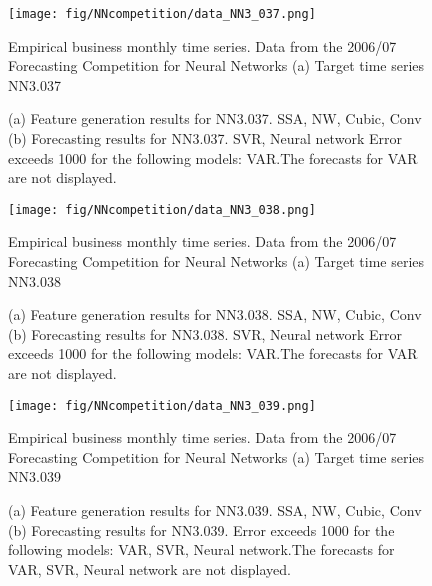 \documentclass[12pt]{article}
\begin{document}
\begin{figure}
\centering
\texttt{[image: fig/NNcompetition/data\_NN3\_037.png]}
\caption{Empirical business monthly time series. Data from the 2006/07 Forecasting Competition for Neural Networks	(a) Target time series	NN3.037	}
\end{figure}


\begin{figure}
\centering
{}
\caption{(a)	Feature generation results for	NN3.037.	SSA, NW, Cubic, Conv	(b)	Forecasting results for	NN3.037.	SVR, Neural network	Error exceeds 1000 for the following models: VAR.The forecasts for VAR are not displayed.	}
\end{figure}


\begin{figure}
\centering
\texttt{[image: fig/NNcompetition/data\_NN3\_038.png]}
\caption{Empirical business monthly time series. Data from the 2006/07 Forecasting Competition for Neural Networks	(a) Target time series	NN3.038	}
\end{figure}


\begin{figure}
\centering
{}
\caption{(a)	Feature generation results for	NN3.038.	SSA, NW, Cubic, Conv	(b)	Forecasting results for	NN3.038.	SVR, Neural network	Error exceeds 1000 for the following models: VAR.The forecasts for VAR are not displayed.	}
\end{figure}


\begin{figure}
\centering
\texttt{[image: fig/NNcompetition/data\_NN3\_039.png]}
\caption{Empirical business monthly time series. Data from the 2006/07 Forecasting Competition for Neural Networks	(a) Target time series	NN3.039	}
\end{figure}


\begin{figure}
\centering
{}
\caption{(a)	Feature generation results for	NN3.039.	SSA, NW, Cubic, Conv	(b)	Forecasting results for	NN3.039.		Error exceeds 1000 for the following models: VAR, SVR, Neural network.The forecasts for VAR, SVR, Neural network are not displayed.	}
\end{figure}
\end{document}
